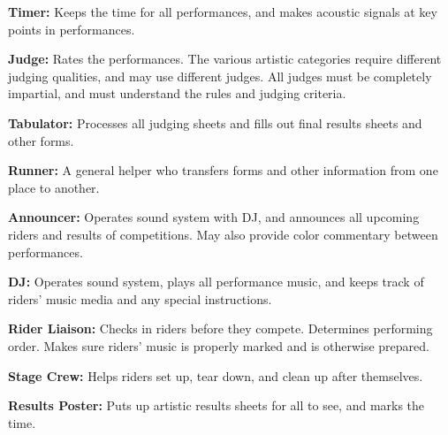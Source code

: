 \textbf{Timer:} Keeps the time for all performances, and makes acoustic signals at key points in performances.

\textbf{Judge:} Rates the performances.
The various artistic categories require different judging qualities, and may use different judges.
All judges must be completely impartial, and must understand the rules and judging criteria.

\textbf{Tabulator:} Processes all judging sheets and fills out final results sheets and other forms.

\textbf{Runner:} A general helper who transfers forms and other information from one place to another.

\textbf{Announcer:} Operates sound system with DJ, and announces all upcoming riders and results of competitions.
May also provide color commentary between performances.

\textbf{DJ:} Operates sound system, plays all performance music, and keeps track of riders' music media and any special instructions.

\textbf{Rider Liaison:} Checks in riders before they compete.
Determines performing order.
Makes sure riders' music is properly marked and is otherwise prepared.

\textbf{Stage Crew:} Helps riders set up, tear down, and clean up after themselves.

\textbf{Results Poster:} Puts up artistic results sheets for all to see, and marks the time.
